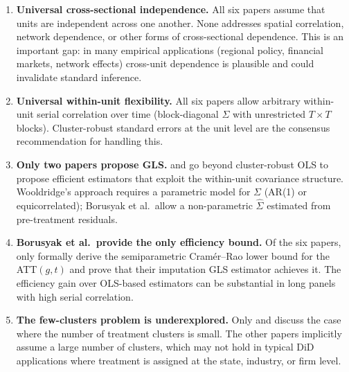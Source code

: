 \documentclass[12pt]{article}
\begin{document}
\begin{enumerate}

  \item \textbf{Universal cross-sectional independence.}
        All six papers assume that units are independent across one another.
        None addresses spatial correlation, network dependence, or other
        forms of cross-sectional dependence.
        This is an important gap: in many empirical applications (regional
        policy, financial markets, network effects) cross-unit dependence
        is plausible and could invalidate standard inference.

  \item \textbf{Universal within-unit flexibility.}
        All six papers allow arbitrary within-unit serial correlation over
        time (block-diagonal $\Sigma$ with unrestricted $T \times T$ blocks).
        Cluster-robust standard errors at the unit level are the consensus
        recommendation for handling this.

  \item \textbf{Only two papers propose GLS.}
        \citet{wooldridge2025twoway} and \citet{borusyak2024revisiting} go
        beyond cluster-robust OLS to propose efficient estimators that
        exploit the within-unit covariance structure.
        Wooldridge's approach requires a parametric model for $\Sigma$
        (AR(1) or equicorrelated); Borusyak et al.\ allow a non-parametric
        $\hat{\Sigma}$ estimated from pre-treatment residuals.

  \item \textbf{Borusyak et al.\ provide the only efficiency bound.}
        Of the six papers, only \citet{borusyak2024revisiting} formally
        derive the semiparametric Cram\'{e}r--Rao lower bound for the
        ATT$(g,t)$ and prove that their imputation GLS estimator achieves it.
        The efficiency gain over OLS-based estimators can be substantial in
        long panels with high serial correlation.

  \item \textbf{The few-clusters problem is underexplored.}
        Only \citet{dechaisemartin2023twoway} and \citet{callaway2021difference}
        discuss the case where the number of treatment clusters is small.
        The other papers implicitly assume a large number of clusters, which
        may not hold in typical DiD applications where treatment is assigned
        at the state, industry, or firm level.


\end{enumerate}
\end{document}
